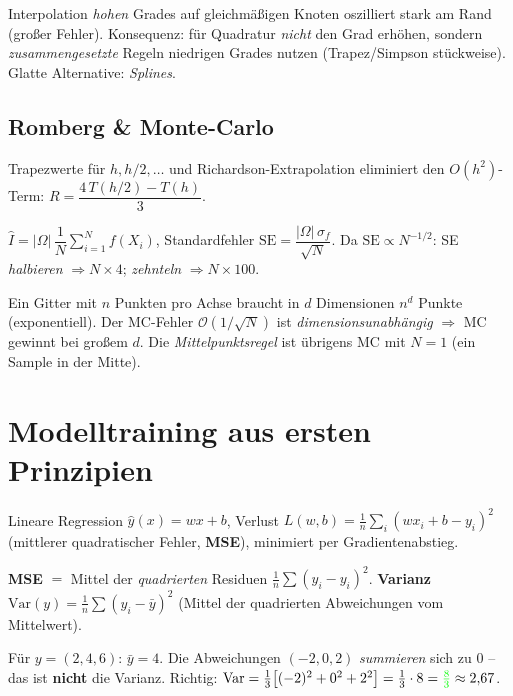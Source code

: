 \documentclass[a4paper,11pt]{article}
\newcommand{\f}[1]{\textcolor{green}{#1}}
\begin{document}
\begin{merke}
Interpolation \emph{hohen} Grades auf gleichmäßigen Knoten oszilliert stark am Rand (großer Fehler).
Konsequenz: für Quadratur \emph{nicht} den Grad erhöhen, sondern \emph{zusammengesetzte} Regeln
niedrigen Grades nutzen (Trapez/Simpson stückweise). Glatte Alternative: \emph{Splines}.
\end{merke}

\subsection{Romberg \& Monte-Carlo}
\begin{formel}[Romberg]
Trapezwerte für $h, h/2,\dots$ und Richardson-Extrapolation eliminiert den $O(h^2)$-Term:
$R=\dfrac{4\,T(h/2)-T(h)}{3}$.
\end{formel}
\begin{formel}
$\hat I=|\Omega|\,\dfrac1N\sum_{i=1}^N f(X_i)$, Standardfehler $\mathrm{SE}=\dfrac{|\Omega|\,\sigma_f}{\sqrt N}$.
Da $\mathrm{SE}\propto N^{-1/2}$: SE \emph{halbieren} $\Rightarrow N\times4$; \emph{zehnteln} $\Rightarrow N\times100$.
\end{formel}
\begin{merke}
Ein Gitter mit $n$ Punkten pro Achse braucht in $d$ Dimensionen $n^{d}$ Punkte (exponentiell). Der
MC-Fehler $\mathcal O(1/\sqrt N)$ ist \emph{dimensionsunabhängig} $\Rightarrow$ MC gewinnt bei großem
$d$. Die \emph{Mittelpunktsregel} ist übrigens MC mit $N=1$ (ein Sample in der Mitte).
\end{merke}

\section{Modelltraining aus ersten Prinzipien}
Lineare Regression $\hat y(x)=wx+b$, Verlust $L(w,b)=\tfrac1n\sum_i (wx_i+b-y_i)^2$ (mittlerer
quadratischer Fehler, \textbf{MSE}), minimiert per Gradientenabstieg.

\begin{formel}
\textbf{MSE} $=$ Mittel der \emph{quadrierten} Residuen $\tfrac1n\sum(\hat y_i-y_i)^2$.
\textbf{Varianz} $\mathrm{Var}(y)=\tfrac1n\sum (y_i-\bar y)^2$ (Mittel der quadrierten Abweichungen vom
Mittelwert).
\end{formel}

\begin{achtung}
Für $y=(2,4,6)$: $\bar y=4$. Die Abweichungen $(-2,0,2)$ \emph{summieren} sich zu $0$ -- das ist
\textbf{nicht} die Varianz. Richtig: $\mathrm{Var}=\tfrac13\big[(-2)^2+0^2+2^2\big]=\tfrac13\cdot8=\f{\tfrac83}\approx2{,}67$.
\end{achtung}
\end{document}
